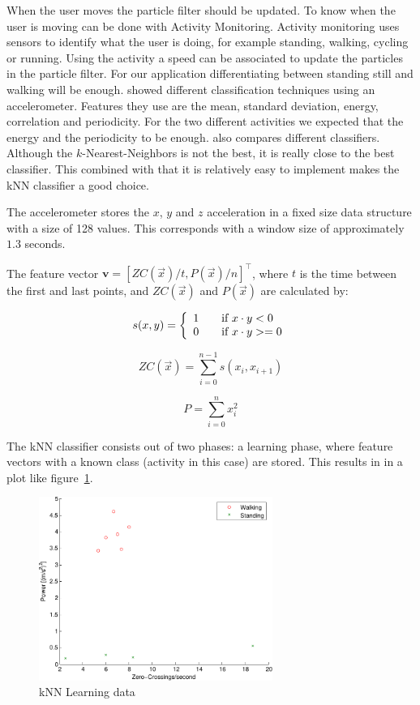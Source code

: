 \documentclass[journal]{IEEEtran}
\let\MYoriglatexcaption\caption
\renewcommand{\caption}[2][\relax]{\MYoriglatexcaption[#2]{#2}}
\begin{document}
When the user moves the particle filter should be updated. To know when the
user is moving can be done with Activity Monitoring. Activity monitoring uses
sensors to identify what the user is doing, for example standing, walking,
cycling or running. Using the activity a speed can be associated to update the
particles in the particle filter. For our application differentiating between
standing still and walking will be enough. \cite{ravi2005activity} showed
different classification techniques using an accelerometer. Features they use
are the mean, standard deviation, energy, correlation and periodicity.  For the
two different activities we expected that the energy and the periodicity to
be enough. \cite{ravi2005activity} also compares different classifiers.
Although the $k$-Nearest-Neighbors is not the best, it is really close to the
best classifier. This combined with that it is relatively easy to implement
makes the kNN classifier a good choice.

The accelerometer stores the $x$, $y$ and $z$ acceleration in a fixed size
data structure with a size of 128 values. This corresponds with a window size
of approximately $1.3$ seconds.

The feature vector $\mathbf{v} = [ZC(\vec x) / t, P(\vec x)/ n]^\intercal$,
where $t$ is the time between the first and last points, and $ZC(\vec x)$ and
$P(\vec x)$ are calculated by:

\begin{equation}
  s(x,y) = \left\{
    \begin{array}{l l}
      1 & \quad \text{if~} x \cdot y < 0 \\
      0 & \quad \text{if~} x \cdot y >= 0
  \end{array} \right.
\end{equation}

\begin{equation}
  ZC(\vec x) = \sum^{n-1}_{i=0} s(x_i, x_{i+1})
\end{equation}

\begin{equation}
  P = \sum^{n}_{i=0} x_i^2
\end{equation}

The kNN classifier consists out of two phases: a learning phase, where feature
vectors with a known class (activity in this case) are stored. This results in
in a plot like figure~\ref{fig:knn-data}.

\begin{figure}
  \centering
  \includegraphics[width=3in]{images/knn-data.pdf}
  \caption{kNN Learning data}
  \label{fig:knn-data}
\end{figure}
\end{document}
